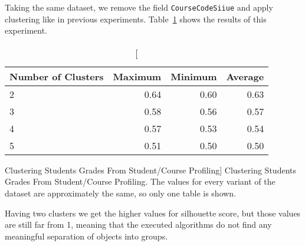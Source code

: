 Taking the same dataset, we remove the field \texttt{CourseCodeSiiue} and apply
clustering like in previous experiments. Table~\ref{tab:exp_006_res} shows the
results of this experiment.

\begin{table}[h!]
    \centering

    \begin{tabular}{| l | r | r | r |}
        \hline
        \textbf{Number of Clusters} & \textbf{Maximum} & \textbf{Minimum} & \textbf{Average} \\ \hline
        2 & 0.64 & 0.60 & 0.63 \\ \hline
        3 & 0.58 & 0.56 & 0.57 \\ \hline
        4 & 0.57 & 0.53 & 0.54 \\ \hline
        5 & 0.51 & 0.50 & 0.50 \\ \hline
    \end{tabular}

    \caption
        [Clustering Students Grades From Student/Course Profiling]
        {Clustering Students Grades From Student/Course Profiling. The values
        for every variant of the dataset are approximately the same, so only
        one table is shown.}

    \label{tab:exp_006_res}
\end{table}

Having two clusters we get the higher values for silhouette score, but those
values are still far from 1, meaning that the executed algorithms do not find
any meaningful separation of objects into groups.
